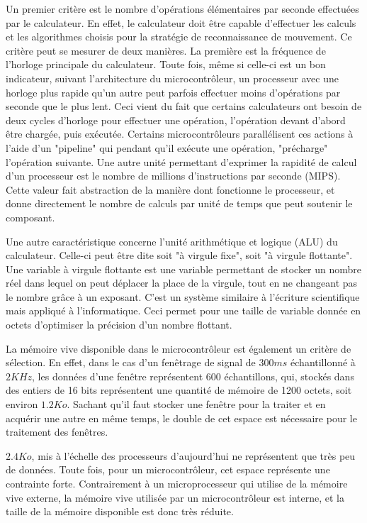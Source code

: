 \documentclass[letterpaper, twoside, 12pt, memoire, creativecommons, hyperref]{thETS}
\begin{document}
Un premier critère est le nombre d'opérations élémentaires par seconde effectuées par le calculateur. En effet, le calculateur doit être capable d'effectuer les calculs et les algorithmes choisis pour la stratégie de reconnaissance de mouvement. Ce critère peut se mesurer de deux manières. La première est la fréquence de l'horloge principale du calculateur. Toute fois, même si celle-ci est un bon indicateur, suivant l'architecture du microcontrôleur, un processeur avec une horloge plus rapide qu'un autre peut parfois effectuer moins d'opérations par seconde que le plus lent. Ceci vient du fait que certains calculateurs ont besoin de deux cycles d'horloge pour effectuer une opération, l'opération devant d'abord être chargée, puis exécutée. Certains microcontrôleurs parallélisent ces actions à l'aide d'un "pipeline" qui pendant qu'il exécute une opération, "précharge" l'opération suivante. Une autre unité permettant d'exprimer la rapidité de calcul d'un processeur est le nombre de millions d'instructions par seconde (MIPS). Cette valeur fait abstraction de la manière dont fonctionne le processeur, et donne directement le nombre de calculs par unité de temps que peut soutenir le composant.

Une autre caractéristique concerne l'unité arithmétique et logique (ALU) du calculateur. Celle-ci peut être dite soit "à virgule fixe", soit "à virgule flottante". Une variable à virgule flottante est une variable permettant de stocker un nombre réel dans lequel on peut déplacer la place de la virgule, tout en ne changeant pas le nombre grâce à un exposant. C'est un système similaire à l'écriture scientifique mais appliqué à l'informatique. Ceci permet pour une taille de variable donnée en octets d'optimiser la précision d'un nombre flottant.

La mémoire vive disponible dans le microcontrôleur est également un critère de sélection. En effet, dans le cas d'un fenêtrage de signal de $300 ms$ échantillonné à $2 KHz$, les données  d'une fenêtre représentent 600 échantillons, qui, stockés dans des entiers de 16 bits représentent une quantité de mémoire de 1200 octets, soit environ $1.2 Ko$. Sachant qu'il faut stocker une fenêtre pour la traiter et en acquérir une autre en même temps, le double de cet espace est nécessaire pour le traitement des fenêtres. 

$2.4Ko$, mis à l'échelle des processeurs d'aujourd'hui ne représentent que très peu de données. Toute fois, pour un microcontrôleur, cet espace représente une contrainte forte. Contrairement à un microprocesseur qui utilise de la mémoire vive externe, la mémoire vive utilisée par un microcontrôleur est interne, et la taille de la mémoire disponible est donc très réduite. 
\end{document}
